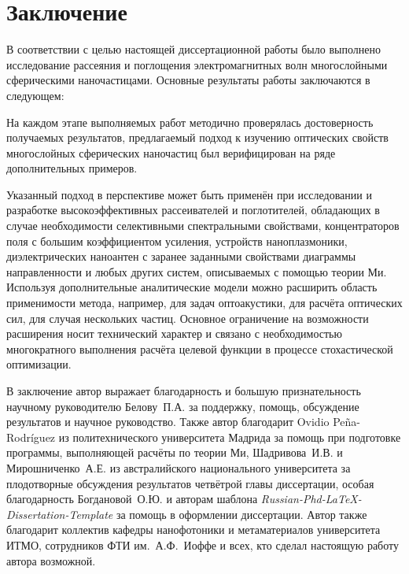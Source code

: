 \chapter*{Заключение}						%

В соответствии с целью настоящей диссертационной работы было выполнено
исследование рассеяния и поглощения электромагнитных волн
многослойными сферическими наночастицами.
Основные результаты работы заключаются в следующем:

На каждом этапе выполняемых работ методично проверялась достоверность
получаемых результатов, предлагаемый подход к изучению оптических
свойств многослойных сферических наночастиц был верифицирован на ряде
дополнительных примеров.

Указанный подход в перспективе может быть применён при исследовании и
разработке высокоэффективных рассеивателей и поглотителей, обладающих
в случае необходимости селективными спектральными свойствами,
концентраторов поля с большим коэффициентом усиления, устройств
наноплазмоники, диэлектрических наноантен с заранее заданными
свойствами диаграммы направленности и любых других систем, описываемых
с помощью теории Ми. Используя дополнительные аналитические модели
можно расширить область применимости метода, например, для задач
оптоакустики, для расчёта оптических сил, для случая нескольких
частиц. Основное ограничение на возможности расширения носит
технический характер и связано с необходимостью многократного
выполнения расчёта целевой функции в процессе стохастической
оптимизации.

В заключение автор выражает благодарность и большую признательность
научному руководителю Белову~П.А. за поддержку, помощь, обсуждение
результатов и научное руководство. Также автор благодарит Ovidio
Pe\~{n}a-Rodr\'{i}guez из политехнического университета Мадрида за
помощь при подготовке программы, выполняющей расчёты по теории Ми,
Шадривова~И.В. и Мирошниченко~А.Е. из австралийского национального
университета за плодотворные обсуждения результатов четвётрой главы
диссертации, особая благодарность Богдановой~О.Ю. и авторам шаблона 
\textit{Russian-Phd-LaTeX-Dissertation-Template} за помощь в
оформлении диссертации. Автор также благодарит коллектив кафедры
нанофотоники и метаматериалов университета ИТМО, сотрудников ФТИ
им.~А.Ф.~Иоффе и всех, кто сделал настоящую работу автора возможной.

